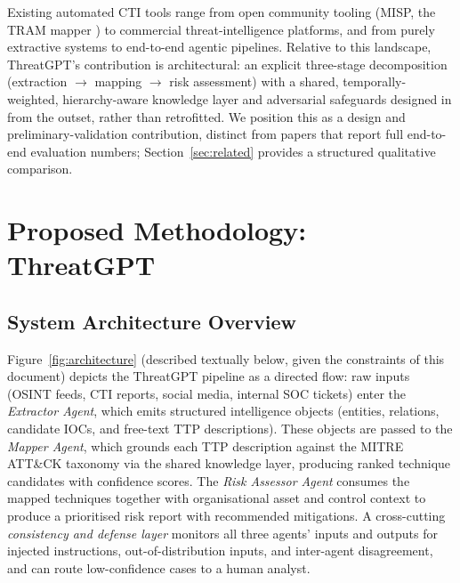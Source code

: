 \documentclass[runningheads]{llncs}
\begin{document}
Existing automated CTI tools range from open community tooling (MISP, the TRAM mapper \cite{tramtool}) to commercial threat-intelligence platforms, and from purely extractive systems to end-to-end agentic pipelines. Relative to this landscape, ThreatGPT's contribution is architectural: an explicit three-stage decomposition (extraction $\rightarrow$ mapping $\rightarrow$ risk assessment) with a shared, temporally-weighted, hierarchy-aware knowledge layer and adversarial safeguards designed in from the outset, rather than retrofitted. We position this as a design and preliminary-validation contribution, distinct from papers that report full end-to-end evaluation numbers; Section~\ref{sec:related} provides a structured qualitative comparison.

\section{Proposed Methodology: ThreatGPT}
\label{sec:methodology}

\subsection{System Architecture Overview}

Figure~\ref{fig:architecture} (described textually below, given the constraints of this document) depicts the ThreatGPT pipeline as a directed flow: raw inputs (OSINT feeds, CTI reports, social media, internal SOC tickets) enter the \emph{Extractor Agent}, which emits structured intelligence objects (entities, relations, candidate IOCs, and free-text TTP descriptions). These objects are passed to the \emph{Mapper Agent}, which grounds each TTP description against the MITRE ATT\&CK taxonomy via the shared knowledge layer, producing ranked technique candidates with confidence scores. The \emph{Risk Assessor Agent} consumes the mapped techniques together with organisational asset and control context to produce a prioritised risk report with recommended mitigations. A cross-cutting \emph{consistency and defense layer} monitors all three agents' inputs and outputs for injected instructions, out-of-distribution inputs, and inter-agent disagreement, and can route low-confidence cases to a human analyst.
\end{document}
